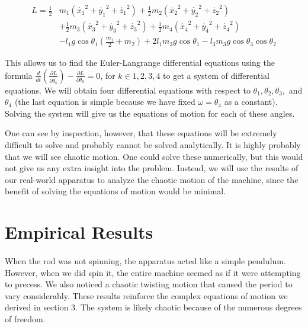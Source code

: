 \documentclass[12pt]{article}
\begin{document}
\begin{equation}
\begin{split}
L = \frac{1}{2}& m_1 \left(\dot{x_1}^2 + \dot{y_1}^2 + \dot{z_1}^2 \right) + \frac{1}{2} m_2 \left(\dot{x_2}^2 + \dot{y_2}^2 + \dot{z_2}^2 \right) \\
 & +  \frac{1}{2} m_3 \left(\dot{x_3}^2 + \dot{y_3}^2 + \dot{z_3}^2 \right) + \frac{1}{2} m_4 \left(\dot{x_4}^2 + \dot{y_4}^2 + \dot{z_4}^2 \right) \\
 & - l_1 g \cos \theta_1 \left( \frac{m_1}{2} + m_2 \right) + 2 l_1 m_3 g \cos \theta_1 - l_3 m_3 g \cos \theta_3 \cos \theta_2
\end{split}
\end{equation}

This allows us to find the Euler-Langrange differential equations using the formula $ \frac{d}{dt} \left( \frac{\partial L} {\partial \dot{\theta_k}} \right) - \frac {\partial L}{\partial \theta_k} = 0$, for $ k \in 1,2,3,4$ to get a system of differential equations. We will obtain four differential equations with respect to $ \theta_1, \theta_2, \theta_3,$ and $\theta_4$ (the last equation is simple because we have fixed $\omega = \theta_4$ as a constant). Solving the system will give us the equations of motion for each of these angles.

One can see by inspection, however, that these equations will be extremely difficult to solve and probably cannot be solved analytically. It is highly probably that we will see chaotic motion. One could solve these numerically, but this would not give us any extra insight into the problem. Instead, we will use the results of our real-world apparatus to analyze the chaotic motion of the machine, since the benefit of solving the equations of motion would be minimal.

\section{Empirical Results}

\paragraph{} When the rod was not spinning, the apparatus acted like a simple pendulum. However, when we did spin it, the entire machine seemed as if it were attempting to precess. We also noticed a chaotic twisting motion that caused the period to vary considerably. These results reinforce the complex equations of motion we derived in section 3. The system is likely chaotic because of the numerous degrees of freedom.
\end{document}
